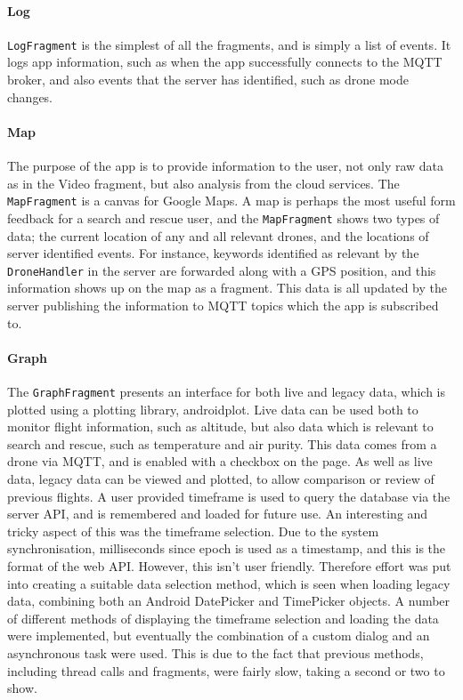 \documentclass{article}
\begin{document}
\paragraph{Log}
\texttt{LogFragment} is the simplest of all the fragments, and is simply a list of events. It logs app information, such as when the app successfully connects to the MQTT broker, and also events that the server has identified, such as drone mode changes. 

\paragraph{Map}
The purpose of the app is to provide information to the user, not only raw data as in the Video fragment, but also analysis from the cloud services. The \texttt{MapFragment} is a canvas for Google Maps. A map is perhaps the most useful form feedback for a search and rescue user, and the \texttt{MapFragment} shows two types of data; the current location of any and all relevant drones, and the locations of server identified events. For instance, keywords identified as relevant by the \texttt{DroneHandler} in the server are forwarded along with a GPS position, and this information shows up on the map as a fragment. This data is all updated by the server publishing the information to MQTT topics which the app is subscribed to.

\paragraph{Graph}
The \texttt{GraphFragment} presents an interface for both live and legacy data, which is plotted using a plotting library, androidplot. Live data can be used both to monitor flight information, such as altitude, but also data which is relevant to search and rescue, such as temperature and air purity. This data comes from a drone via MQTT, and is enabled with a checkbox on the page. As well as live data, legacy data can be viewed and plotted, to allow comparison or review of previous flights. A user provided timeframe is used to query the database via the server API, and is remembered and loaded for future use. An interesting and tricky aspect of this was the timeframe selection. Due to the system synchronisation, milliseconds since epoch is used as a timestamp, and this is the format of the web API. However, this isn't user friendly. Therefore effort was put into creating a suitable data selection method, which is seen when loading legacy data, combining both an Android DatePicker and TimePicker objects. A number of different methods of displaying the timeframe selection and loading the data were implemented, but eventually the combination of a custom dialog and an asynchronous task were used. This is due to the fact that previous methods, including thread calls and fragments, were fairly slow, taking a second or two to show. 
\end{document}
